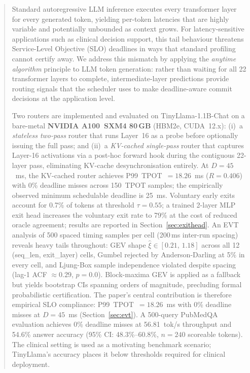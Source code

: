 \documentclass[conference]{IEEEtran}
\begin{document}
\begin{abstract}
Standard autoregressive LLM inference executes every transformer layer for
every generated token, yielding per-token latencies that are highly variable
and potentially unbounded as context grows.
For latency-sensitive applications such as clinical decision support,
this tail behaviour threatens Service-Level Objective (SLO) deadlines
in ways that standard profiling cannot certify away.
We address this mismatch by applying the \emph{anytime algorithm}
principle to LLM token generation: rather than waiting for all 22 transformer
layers to complete, intermediate-layer predictions provide routing signals
that the scheduler uses to make deadline-aware commit decisions at the
application level.

Two routers are implemented and evaluated on TinyLlama-1.1B-Chat on a
bare-metal \textbf{NVIDIA A100~SXM4 80\,GB} (HBM2e, CUDA~12.x):
(i)~a \emph{stateless two-pass} router that runs Layer~16 as a probe
     before optionally issuing the full pass; and
(ii)~a \emph{KV-cached single-pass} router that captures Layer-16
     activations via a post-hoc forward hook during the contiguous
     22-layer pass, eliminating KV-cache desynchronisation entirely.
At $D=45$~ms, the KV-cached router achieves P99~TPOT~$=18.26$~ms
($R=0.406$) with 0\% deadline misses across 150~TPOT samples;
the empirically observed minimum schedulable deadline is 25~ms.
Voluntary early exits account for 0.7\% of tokens at threshold $\tau=0.55$;
a trained 2-layer MLP exit head increases the voluntary exit rate to 79\%
at the cost of reduced oracle agreement; results are reported in
Section~\ref{sec:exithead}.
An EVT analysis of 500 spaced timing samples per cell (200\,ms inter-run
spacing) reveals heavy tails throughout: GEV shape $\hat{\xi} \in [0.21,\,1.18]$
across all 12 (seq\_len, exit\_layer) cells, Gumbel rejected by
Anderson-Darling at 5\% in every cell, and Ljung-Box sample independence
violated despite spacing (lag-1 ACF ${\approx}0.29$, $p{=}0.0$).
Block-maxima GEV is applied as a fallback but yields bootstrap CIs
spanning orders of magnitude, precluding formal probabilistic certification.
The paper's central contribution is therefore empirical SLO compliance:
P99~TPOT~$=18.26$~ms with 0\% deadline misses at $D=45$~ms (Section~\ref{sec:evt}).
A 500-query PubMedQA evaluation achieves 0\% deadline misses at
56.81~tok/s throughput and 54.6\% answer accuracy
(95\% CI: 48.3\%--60.8\%, $n{=}240$ scoreable tokens).
The clinical setting is used as a motivating benchmark scenario;
TinyLlama's accuracy places it below thresholds required for clinical
deployment.
\end{abstract}
\end{document}
